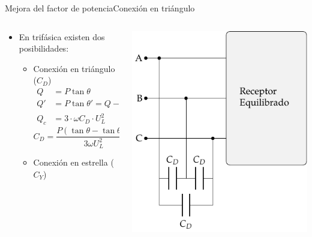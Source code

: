 \documentclass[aspectratio=169, xcolor={usenames,svgnames,dvipsnames}]{beamer}
\begin{document}
\begin{frame}{Mejora del factor de potencia}{Conexión en triángulo}
\begin{columns}
\begin{column}{0.5\linewidth}
\begin{itemize}
\item En trifásica existen dos posibilidades:
\begin{itemize}
\item Conexión en triángulo (\(C_D\))
\begin{align*}
  Q &= P\tan\theta\\
  Q' &= P\tan\theta' = Q - Q_c\\
  Q_c &= 3 \cdot \omega C_D \cdot U_L^2
\end{align*}
\[
  \boxed{C_D = \frac{P(\tan \theta - \tan \theta')}{3\omega U_L^2}}
\]
\item Conexión en estrella (\(C_Y\))
\end{itemize}
\end{itemize}
\end{column}
\begin{column}{0.5\linewidth}
\begin{center}
\includegraphics[width=.8\linewidth]{../figs/CircuitoTrifasica_CompensacionReactiva.pdf}
\end{center}
\end{column}
\end{columns}
\end{frame}
\end{document}
